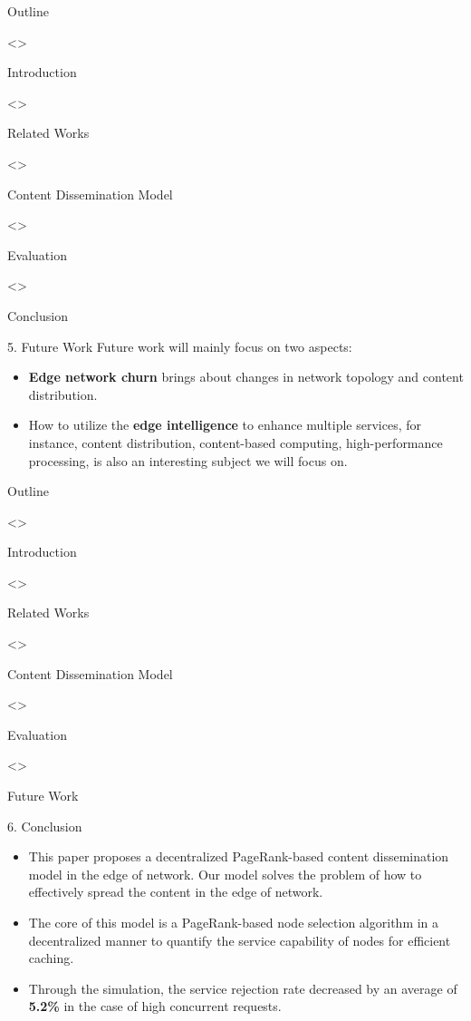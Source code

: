\documentclass{beamer}		%
\begin{document}
\begin{frame}{Outline}
\begin{enumerate}[1. ]
\uncover<>{\item Introduction}
\uncover<>{\item Related Works}
\uncover<>{\item Content Dissemination Model}
\uncover<>{\item Evaluation}
\uncover<>{\item Conclusion}
\end{enumerate}
\end{frame}

\begin{frame}{5. Future Work}
Future work will mainly focus on two aspects:
\begin{itemize}
    \item \textbf{Edge network churn} brings about changes in network topology and content distribution.
    \item How to utilize the \textbf{edge intelligence} to enhance multiple services, for instance, content distribution, content-based computing, high-performance processing, is also an interesting subject we will focus on.
\end{itemize}
\end{frame}

\begin{frame}{Outline}
\begin{enumerate}[1. ]
\uncover<>{\item Introduction}
\uncover<>{\item Related Works}
\uncover<>{\item Content Dissemination Model}
\uncover<>{\item Evaluation}
\uncover<>{\item Future Work}
\end{enumerate}
\end{frame}

\begin{frame}{6. Conclusion}
\begin{itemize}
    \item This paper proposes a decentralized PageRank-based content dissemination model in the edge of network. Our model solves the problem of how to effectively spread the content in the edge of network.
    \item The core of this model is a PageRank-based node selection algorithm in a decentralized manner to quantify the service capability of nodes for efficient caching.
    \item  Through the simulation, the service rejection rate decreased by an average of \textbf{5.2\%} in the case of high concurrent requests.
\end{itemize}
\end{frame}
\end{document}
